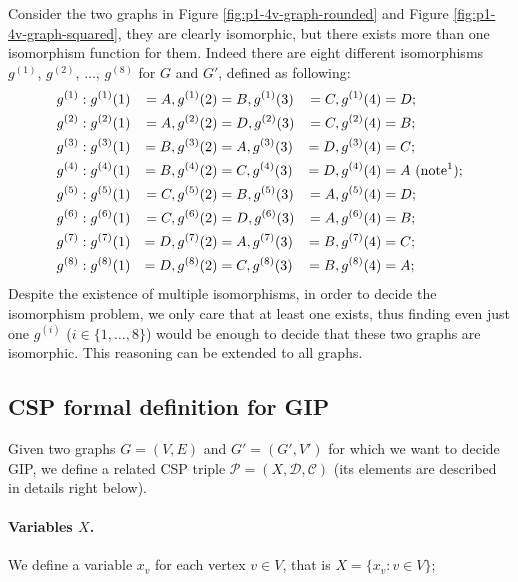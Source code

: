 \documentclass[a4paper,12pt]{article}
\theoremstyle{newplanestyle}
\theoremstyle{newdefinitionstyle}
\theoremstyle{newprovestyle}
\begin{document}
Consider the two graphs in Figure \ref{fig:p1-4v-graph-rounded} and Figure \ref{fig:p1-4v-graph-squared}, they are clearly isomorphic, but there exists more than one isomorphism function for them. Indeed there are eight different isomorphisms $g^{(1)}$, $g^{(2)}$, $\dots$, $g^{(8)}$ for $G$ and $G'$, defined as following:
\begin{alignat*}{5}
g^{(1)} &: g^{(1)}(1) &= A, g^{(1)}(2) &= B, g^{(1)}(3) &= C, g^{(1)}(4) &= D;\\
g^{(2)} &: g^{(2)}(1) &= A, g^{(2)}(2) &= D, g^{(2)}(3) &= C, g^{(2)}(4) &= B;\\
g^{(3)} &: g^{(3)}(1) &= B, g^{(3)}(2) &= A, g^{(3)}(3) &= D, g^{(3)}(4) &= C;\\
g^{(4)} &: g^{(4)}(1) &= B, g^{(4)}(2) &= C, g^{(4)}(3) &= D, g^{(4)}(4) &= A \text{ (note\footnotemark)};\\
g^{(5)} &: g^{(5)}(1) &= C, g^{(5)}(2) &= B, g^{(5)}(3) &= A, g^{(5)}(4) &= D;\\
g^{(6)} &: g^{(6)}(1) &= C, g^{(6)}(2) &= D, g^{(6)}(3) &= A, g^{(6)}(4) &= B;\\
g^{(7)} &: g^{(7)}(1) &= D, g^{(7)}(2) &= A, g^{(7)}(3) &= B, g^{(7)}(4) &= C;\\
g^{(8)} &: g^{(8)}(1) &= D, g^{(8)}(2) &= C, g^{(8)}(3) &= B, g^{(8)}(4) &= A;
\end{alignat*}
Despite the existence of multiple isomorphisms, in order to decide the isomorphism problem, we only care that at least one exists, thus finding even just one $g^{(i)}$ ($i \in \{1,\dots,8\}$) would be enough to decide that these two graphs are isomorphic. This reasoning can be extended to all graphs.

\subsection{CSP formal definition for GIP}
Given two graphs $G=(V,E)$ and $G'=(G',V')$ for which we want to decide GIP, we define a related CSP triple $\mathcal{P}=(X,\mathcal{D},\mathcal{C})$ (its elements are described in details right below).

\paragraph{Variables $X$.}
We define a variable $x_v$ for each vertex $v \in V$, that is $X = \{x_v : v \in V\}$;
\end{document}

